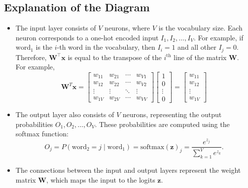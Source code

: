 \begin{notechapter}
\subsection{Explanation of the Diagram}
\begin{itemize}
    \item The input layer consists of \( V \) neurons, where \( V \) is the
          vocabulary size. Each neuron corresponds to a one-hot encoded input
          \( I_1, I_2, \dots, I_V \). For example, if \(\text{word}_1\) is the
          \(i\)-th word in the vocabulary, then \( I_i = 1 \) and all other
          \( I_j = 0 \).\\
          Therefore, $\mathbf{W}^\top \mathbf{x}$ is equal to the transpose
          of the $i^{\text{th}}$ line of the matrix $\mathbf{W}$.\\
          For example,
          \[
            \mathbf{W}^{T} \mathbf{x} = 
            \begin{bmatrix}
            w_{11} & w_{21} & \cdots & w_{V1} \\
            w_{12} & w_{22} & \cdots & w_{V2} \\
            \vdots & \vdots & \ddots & \vdots \\
            w_{1V} & w_{2V} & \cdots & w_{VV}
            \end{bmatrix}
            \begin{bmatrix}
                  1 \\
                  0 \\
                  \vdots \\
                  0
            \end{bmatrix} =
            \begin{bmatrix}
                  w_{11} \\ w_{12} \\ \vdots \\ w_{1V}
            \end{bmatrix}
            \]
    \item The output layer also consists of \( V \) neurons, representing the
          output probabilities \( O_1, O_2, \dots, O_V \). These probabilities
          are computed using the softmax function:
          \[
          O_j = P(\text{word}_2 = j \mid \text{word}_1) =
          \text{softmax}(\mathbf{z})_j = \frac{e^{z_j}}{\sum_{k=1}^V e^{z_k}}.
          \]
    \item The connections between the input and output layers represent the
          weight matrix \(\mathbf{W}\), which maps the input to the logits
          \(\mathbf{z}\).
\end{itemize}


\end{notechapter}
